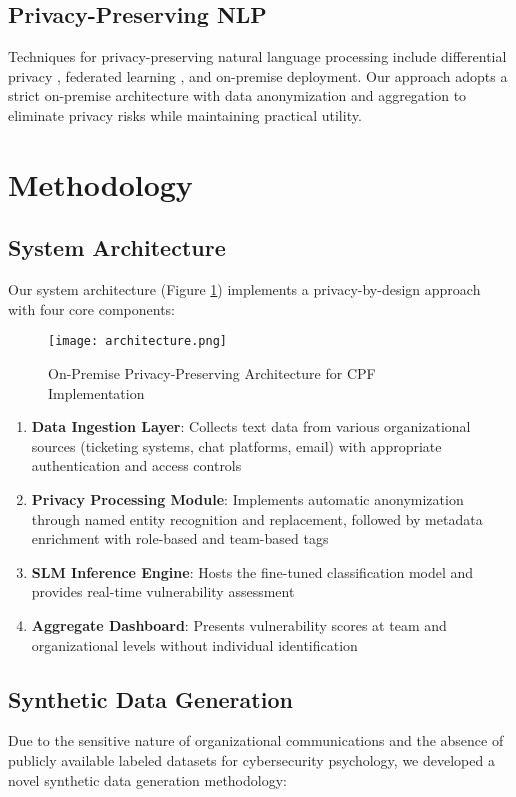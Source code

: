 \documentclass[11pt,a4paper]{article}
\begin{document}
\subsection{Privacy-Preserving NLP}
Techniques for privacy-preserving natural language processing include differential privacy \cite{dwork2006}, federated learning \cite{konevcny2016}, and on-premise deployment. Our approach adopts a strict on-premise architecture with data anonymization and aggregation to eliminate privacy risks while maintaining practical utility.

\section{Methodology}

\subsection{System Architecture}
Our system architecture (Figure \ref{fig:arch}) implements a privacy-by-design approach with four core components:

\begin{figure}[h!]
    \centering
    \texttt{[image: architecture.png]}
    \caption{On-Premise Privacy-Preserving Architecture for CPF Implementation}
    \label{fig:arch}
\end{figure}

\begin{enumerate}
    \item \textbf{Data Ingestion Layer}: Collects text data from various organizational sources (ticketing systems, chat platforms, email) with appropriate authentication and access controls
    \item \textbf{Privacy Processing Module}: Implements automatic anonymization through named entity recognition and replacement, followed by metadata enrichment with role-based and team-based tags
    \item \textbf{SLM Inference Engine}: Hosts the fine-tuned classification model and provides real-time vulnerability assessment
    \item \textbf{Aggregate Dashboard}: Presents vulnerability scores at team and organizational levels without individual identification
\end{enumerate}

\subsection{Synthetic Data Generation}
Due to the sensitive nature of organizational communications and the absence of publicly available labeled datasets for cybersecurity psychology, we developed a novel synthetic data generation methodology:
\end{document}
